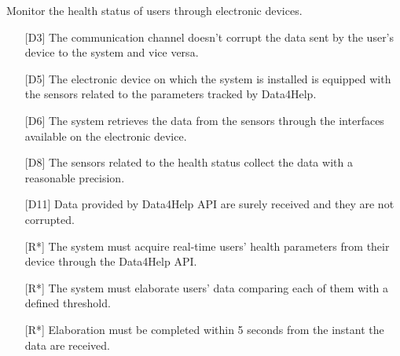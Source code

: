 \begin{enumerate} [resume, label={[G\arabic*]}]
    \item Monitor the health status of users through electronic devices.
        \begin{itemize}
            \item [{[D3]}] The communication channel doesn't corrupt the data sent by the user's device to the system and vice versa.
            \item [{[D5]}] The electronic device on which the system is installed is equipped with the sensors related to the parameters tracked by Data4Help.
            \item [{[D6]}] The  system  retrieves  the  data  from  the  sensors  through  the  interfaces available on the electronic device.
            \item [{[D8]}] The sensors related to the health status collect the data with a reasonable precision.
            \item [{[D11]}] Data  provided  by  Data4Help  API  are  surely  received  and  they  are  not corrupted.
            \item [{[R*]}] The system must acquire real-time users' health parameters from their device through the Data4Help API.
            \item [{[R*]}] The system must elaborate users' data comparing each of them with a defined threshold. 
            \item [{[R*]}] Elaboration must be completed within 5 seconds from the instant the data are received.
        \end{itemize}
        

\end{enumerate}
